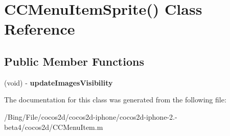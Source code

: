 \hypertarget{interface_c_c_menu_item_sprite_07_08}{\section{C\-C\-Menu\-Item\-Sprite() Class Reference}
\label{interface_c_c_menu_item_sprite_07_08}
}
\subsection*{Public Member Functions}
\begin{DoxyCompactItemize}
\item 
\hypertarget{interface_c_c_menu_item_sprite_07_08_a72613c202fac05d79f4ba89d7bd28fb4}{(void) -\/ {\bfseries update\-Images\-Visibility}}\label{interface_c_c_menu_item_sprite_07_08_a72613c202fac05d79f4ba89d7bd28fb4}

\end{DoxyCompactItemize}


The documentation for this class was generated from the following file\-:\begin{DoxyCompactItemize}
\item 
/\-Bing/\-File/cocos2d/cocos2d-\/iphone/cocos2d-\/iphone-\/2.-\/beta4/cocos2d/C\-C\-Menu\-Item.\-m\end{DoxyCompactItemize}
